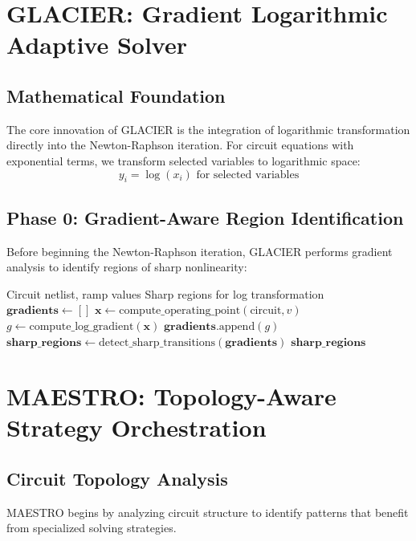 \documentclass[journal]{IEEEtran}
\begin{document}

\section{GLACIER: Gradient Logarithmic Adaptive Solver}

\subsection{Mathematical Foundation}
The core innovation of GLACIER is the integration of logarithmic transformation directly into the Newton-Raphson iteration. For circuit equations with exponential terms, we transform selected variables to logarithmic space:
\begin{equation}
y_i = \log(x_i) \text{ for selected variables}
\end{equation}

\subsection{Phase 0: Gradient-Aware Region Identification}
Before beginning the Newton-Raphson iteration, GLACIER performs gradient analysis to identify regions of sharp nonlinearity:

\begin{algorithm}
\caption{Gradient-Aware Region Identification}
\begin{algorithmic}[1]
\REQUIRE Circuit netlist, ramp values
\ENSURE Sharp regions for log transformation
\STATE $\mathbf{gradients} \leftarrow []$
    \STATE $\mathbf{x} \leftarrow \text{compute\_operating\_point}(\text{circuit}, v)$
    \STATE $g \leftarrow \text{compute\_log\_gradient}(\mathbf{x})$
    \STATE $\mathbf{gradients}.\text{append}(g)$
\ENDFOR
\STATE $\mathbf{sharp\_regions} \leftarrow \text{detect\_sharp\_transitions}(\mathbf{gradients})$
\RETURN $\mathbf{sharp\_regions}$
\end{algorithmic}
\end{algorithm}


\section{MAESTRO: Topology-Aware Strategy Orchestration}

\subsection{Circuit Topology Analysis}
MAESTRO begins by analyzing circuit structure to identify patterns that benefit from specialized solving strategies.
\end{document}

